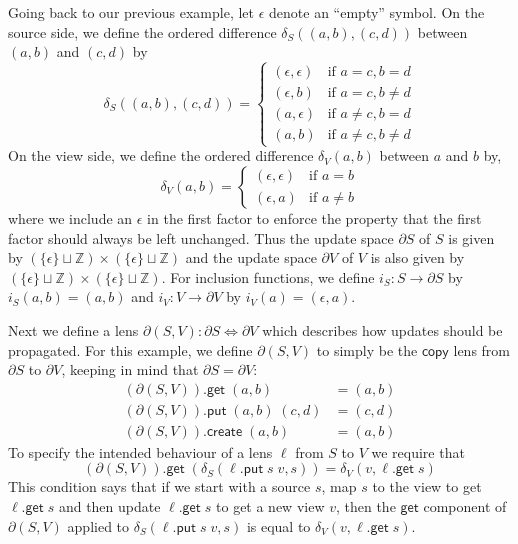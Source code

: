 \documentclass[acmsmall,review,anonymous]{acmart}\settopmatter{printfolios=true,printccs=false,printacmref=false}
\newcommand{\kw}[1]{\ensuremath{\mathsf{#1}}\xspace}
\newcommand{\get}{\ensuremath{\kw{get}}\xspace}
\newcommand{\pput}{\ensuremath{\kw{put}}\xspace}
\newcommand{\create}{\ensuremath{\kw{create}}\xspace}
\newcommand{\ccopy}{\ensuremath{\kw{copy}}\xspace}
\begin{document}
Going back to our previous example, let $\epsilon$ denote an ``empty''
symbol. On the source side, we define the ordered difference $\delta_S((a, b),
(c, d))$ between $(a, b)$ and $(c, d)$ by
$$\delta_S((a, b), (c,
d)) = \begin{cases}
(\epsilon, \epsilon) & \text{if }a = c, b = d\\
(\epsilon, b) & \text{if }a=c, b \neq d\\
(a, \epsilon) & \text{if }a \neq c, b = d\\
(a, b) & \text{if }a \neq c, b \neq d
\end{cases}$$
On the view side, we define the ordered difference $\delta_V(a, b)$
between $a$ and $b$ by, $$\delta_V(a, b) = \begin{cases}
(\epsilon, \epsilon) & \text{if } a = b\\
(\epsilon, a) & \text{if } a \neq b
\end{cases}$$
where we include an $\epsilon$ in the first factor to enforce the property that
the first factor should always be left unchanged. Thus the update space
$\partial S$ of $S$ is given by $(\{\epsilon\} \sqcup \mathbb{Z})
\times(\{\epsilon\} \sqcup \mathbb{Z})$ and the update space $\partial V$ of
$V$ is also given by $(\{\epsilon\} \sqcup \mathbb{Z}) \times(\{\epsilon\}
\sqcup \mathbb{Z})$. For inclusion functions, we define $i_S : S \longrightarrow
\partial S$ by $i_S(a, b) = (a, b)$ and $i_V : V \longrightarrow \partial V$ by
$i_V(a) = (\epsilon, a)$.

Next we define a lens $\partial(S, V) : \partial S \Leftrightarrow \partial V$
which describes how updates should be propagated. For this example, we
define $\partial(S,V)$ to simply be the \ccopy lens from $\partial S$ to
$\partial V$, keeping in mind that $\partial S = \partial V$:
\begin{align*}
(\partial(S, V)).\get \; (a, b) &= (a, b)\\
(\partial(S, V)).\pput \; (a, b) \; (c, d) &= (c, d)\\
(\partial(S, V)).\create \; (a, b) &= (a, b)
\end{align*}
To specify the intended behaviour of a lens $\ell$ from $S$ to $V$ we
require that
\begin{equation}\label{partialpreservesdelta}
(\partial (S, V)).\get \; (\delta_S(\ell.\pput \; s \; v, s)) = \delta_V(v,
\ell.\get \; s)
\end{equation}
This condition says that if we start with a source $s$, map $s$ to the view
to get $\ell.\get \; s$ and then update $\ell.\get \; s$ to get a new view $v$,
then the \get component of $\partial(S, V)$ applied to $\delta_S(\ell.\pput \; s
\; v, s)$ is equal to $\delta_V(v, \ell.\get \; s)$.
\end{document}
